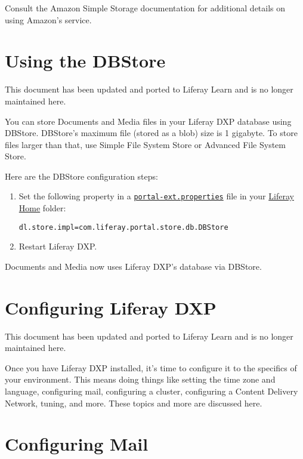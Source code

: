 \noindent\hrulefill

Consult the Amazon Simple Storage documentation for additional details
on using Amazon's service.

\chapter{Using the DBStore}\label{using-the-dbstore}

{This document has been updated and ported to Liferay Learn and is no
longer maintained here.}

You can store Documents and Media files in your Liferay DXP database
using DBStore. DBStore's maximum file (stored as a blob) size is 1
gigabyte. To store files larger than that, use Simple File System Store
or Advanced File System Store.

Here are the DBStore configuration steps:

\begin{enumerate}
\def\labelenumi{\arabic{enumi}.}
\item
  Set the following property in a
  \href{/docs/7-2/deploy/-/knowledge_base/d/portal-properties}{\texttt{portal-ext.properties}}
  file in your
  \href{/docs/7-2/deploy/-/knowledge_base/d/liferay-home}{Liferay Home}
  folder:

\begin{verbatim}
dl.store.impl=com.liferay.portal.store.db.DBStore
\end{verbatim}
\item
  Restart Liferay DXP.
\end{enumerate}

Documents and Media now uses Liferay DXP's database via DBStore.

\chapter{Configuring Liferay DXP}\label{configuring-liferay-dxp}

{This document has been updated and ported to Liferay Learn and is no
longer maintained here.}

Once you have Liferay DXP installed, it's time to configure it to the
specifics of your environment. This means doing things like setting the
time zone and language, configuring mail, configuring a cluster,
configuring a Content Delivery Network, tuning, and more. These topics
and more are discussed here.

\chapter{Configuring Mail}\label{configuring-mail}

